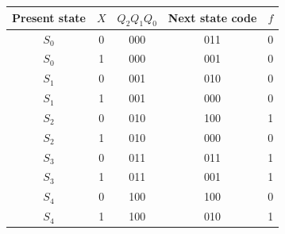 \renewcommand{\arraystretch}{1.05}
\begin{tabular}{|c|c|c|c|c|}
\hline
Present state & $X$ & $Q_2Q_1Q_0$ & Next state code & $f$ \\
\hline
$S_0$ & 0 & 000 & 011 & 0 \\
$S_0$ & 1 & 000 & 001 & 0 \\
$S_1$ & 0 & 001 & 010 & 0 \\
$S_1$ & 1 & 001 & 000 & 0 \\
$S_2$ & 0 & 010 & 100 & 1 \\
$S_2$ & 1 & 010 & 000 & 0 \\
$S_3$ & 0 & 011 & 011 & 1 \\
$S_3$ & 1 & 011 & 001 & 1 \\
$S_4$ & 0 & 100 & 100 & 0 \\
$S_4$ & 1 & 100 & 010 & 1 \\
\hline
\end{tabular}
